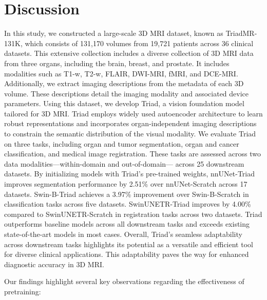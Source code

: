 \section{Discussion}
\label{sec:discussion}


In this study, we constructed a large-scale 3D MRI dataset, known as TriadMR-131K, which consists of 131,170 volumes from 19,721 patients across 36 clinical datasets.
This extensive collection includes a diverse collection of 3D MRI data from three organs, including the brain, breast, and prostate. It includes modalities such as T1-w, T2-w, FLAIR, DWI-MRI, fMRI, and DCE-MRI.
Additionally, we extract imaging descriptions from the metadata of each 3D volume. These descriptions detail the imaging modality and associated device parameters.
Using this dataset, we develop Triad, a vision foundation model tailored for 3D MRI.
Triad employs widely used autoencoder architecture to learn robust representations and incorporates organ-independent imaging descriptions to constrain the semantic distribution of the visual modality.
We evaluate Triad on three tasks, including organ and tumor segmentation, organ and cancer classification, and medical image registration. These tasks are assessed across two data modalities---within-domain and out-of-domain--- across 25 downstream datasets.
By initializing models with Triad's pre-trained weights, nnUNet-Triad improves segmentation performance by 2.51\% over nnUNet-Scratch across 17 datasets. Swin-B-Triad achieves a 3.97\% improvement over Swin-B-Scratch in classification tasks across five datasets. SwinUNETR-Triad improves by 4.00\% compared to SwinUNETR-Scratch in registration tasks across two datasets.
Triad outperforms baseline models across all downstream tasks and exceeds existing state-of-the-art models in most cases.
Overall, Triad's seamless adaptability across downstream tasks highlights its potential as a versatile and efficient tool for diverse clinical applications.
This adaptability paves the way for enhanced diagnostic accuracy in 3D MRI.

Our findings highlight several key observations regarding the effectiveness of pretraining:

